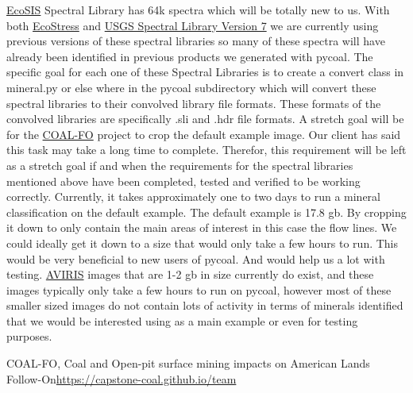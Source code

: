 \documentclass[a4paper,12pt]{article}
\begin{document}
\href{https://ecosis.org/}{EcoSIS} Spectral Library has 64k spectra which will be totally new to us. With both \href{https://speclib.jpl.nasa.gov/}{EcoStress} and \href{https://crustal.usgs.gov/speclab/QueryAll07a.php}{USGS Spectral Library Version 7} we are currently using previous versions of these spectral libraries so many of these spectra will have already been identified in previous products we generated with pycoal. \newline
\newline
The specific goal for each one of these Spectral Libraries is to create a convert class in mineral.py or else where in the pycoal subdirectory which will convert these spectral libraries to their convolved library file formats. These formats of the convolved libraries are specifically .sli and .hdr file formats.\newline
\newline
A stretch goal will be for the \href{https://capstone-coal.github.io/team}{COAL-FO} project to crop the default example image. Our client has said this task may take a long time to complete. Therefor, this requirement will be left as a stretch goal if and when the requirements for the spectral libraries mentioned above have been completed, tested and verified to be working correctly. \newline
\newline
Currently, it takes approximately one to two days to run a mineral classification on the default example. The default example is 17.8 gb. By cropping it down to only contain the main areas of interest in this case the flow lines. We could ideally get it down to a size that would only take a few hours to run. This would be very beneficial to new users of pycoal. And would help us a lot with testing. \href{https://aviris.jpl.nasa.gov/}{AVIRIS} images that are 1-2 gb in size currently do exist, and these images typically only take a few hours to run on pycoal, however most of these smaller sized images do not contain lots of activity in terms of minerals identified that we would be interested using as a main example or even for testing purposes. \newline

\newline

\noindent [1] COAL-FO, Coal and Open-pit surface mining impacts on American Lands Follow-On\newline \url{https://capstone-coal.github.io/team} \newline
\end{document}

